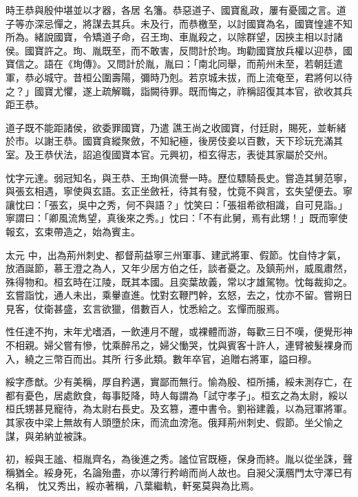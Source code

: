\begin{pinyinscope}
 時王恭與殷仲堪並以才器，各居
 名籓。恭惡道子、國寶亂政，屢有憂國之言。道子等亦深忌憚之，將謀去其兵。未及行，而恭檄至，以討國寶為名，國寶惶遽不知所為。緒說國寶，令矯道子命，召王珣、車胤殺之，以除群望，因挾主相以討諸侯。國寶許之。珣、胤既至，而不敢害，反問計於珣。珣勸國寶放兵權以迎恭，國寶信之。語在《珣傳》。又問計於胤，胤曰：「南北同舉，而荊州未至，若朝廷遣軍，恭必城守。昔桓公圍壽陽，彌時乃剋。若京城未拔，而上流奄至，君將何以待之？」國寶尤懼，遂上疏解職，詣闕待罪。既而悔之，祚稱詔復其本官，欲收其兵距王恭。



 道子既不能距諸侯，欲委罪國寶，乃遣
 譙王尚之收國寶，付廷尉，賜死，並斬緒於市。以謝王恭。國寶貪縱聚斂，不知紀極，後房伎妾以百數，天下珍玩充滿其室。及王恭伏法，詔追復國寶本官。元興初，桓玄得志，表徙其家屬於交州。



 忱字元達。弱冠知名，與王恭、王珣俱流譽一時。歷位驃騎長史。嘗造其舅范寧，與張玄相遇，寧使與玄語。玄正坐斂衽，待其有發，忱竟不與言，玄失望便去。寧讓忱曰：「張玄，吳中之秀，何不與語？」忱笑曰：「張祖希欲相識，自可見詣。」寧謂曰：「卿風流雋望，真後來之秀。」忱曰：「不有此舅，焉有此甥！」既而寧使報玄，玄束帶造之，始為賓主。



 太元
 中，出為荊州刺史、都督荊益寧三州軍事、建武將軍、假節。忱自恃才氣，放酒誕節，慕王澄之為人，又年少居方伯之任，談者憂之。及鎮荊州，威風肅然，殊得物和。桓玄時在江陵，既其本國。且奕葉故義，常以才雄駕物。忱每裁抑之。玄嘗詣忱，通人未出，乘轝直進。忱對玄鞭門幹，玄怒，去之，忱亦不留。嘗朔日見客，仗衛甚盛，玄言欲獵，借數百人，忱悉給之。玄憚而服焉。



 性任達不拘，末年尤嗜酒，一飲連月不醒，或裸體而游，每歡三日不嘆，便覺形神不相親。婦父嘗有慘，忱乘醉吊之，婦父慟哭，忱與賓客十許人，連臂被髮裸身而入，繞之三幣百而出。其所
 行多此類。數年卒官，追贈右將軍，謚曰穆。



 綏字彥猷。少有美稱，厚自矜邁，實鄙而無行。愉為殷、桓所捕，綏未測存亡，在都有憂色，居處飲食，每事貶降，時人每謂為「試守孝子」。桓玄之為太尉，綏以桓氏甥甚見寵待，為太尉右長史。及玄篡，遷中書令。劉裕建義，以為冠軍將軍。其家夜中梁上無故有人頭墮於床，而流血滂沲。俄拜荊州刺史、假節。坐父愉之謀，與弟納並被誅。



 初，綏與王謐、桓胤齊名，為後進之秀。謐位官既極，保身而終。胤以從坐誅，聲稱猶全。綏身死，名論殆盡，亦以薄行矜峭而尚人故也。自昶父漢鴈門太守澤已有名稱，
 忱又秀出，綏亦著稱，八葉繼軌，軒冕莫與為比焉。




\end{pinyinscope}
